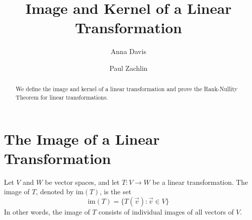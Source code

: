 \documentclass{ximera}
\author{Anna Davis \and Paul Zachlin} \title{Image and Kernel of a Linear Transformation} \license{CC-BY 4.0}
\begin{document}
\begin{abstract}
  We define the image and kernel of a linear transformation and prove the Rank-Nullity Theorem for linear transformations.
\end{abstract}
\maketitle


\section*{The Image of a Linear Transformation}
\begin{definition}\label{def:imageofT}
Let $V$ and $W$ be vector spaces, and let $T:V\rightarrow W$ be a linear transformation.  The image of $T$, denoted by $\text{im}(T)$, is the set
$$\text{im}(T)=\{T(\vec{v}):\vec{v}\in V\}$$
In other words, the image of $T$ consists of individual images of all vectors of $V$.
\end{definition}
\end{document}
